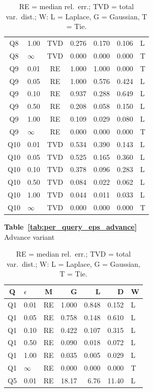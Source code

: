 \documentclass[12pt,letterpaper]{article}
\begin{document}
\begin{table}[H]
\begin{minipage}[t]{0.48\textwidth}
\begin{tabular}{@{}clcrrrl@{}}
Q8 & 1.00 & TVD & 0.276 & 0.170 & 0.106 & L \\
Q8 & $\infty$ & TVD & 0.000 & 0.000 & 0.000 & T \\
\midrule
Q9 & 0.01 & RE & 1.000 & 1.000 & 0.000 & T \\
Q9 & 0.05 & RE & 1.000 & 0.576 & 0.424 & L \\
Q9 & 0.10 & RE & 0.937 & 0.288 & 0.649 & L \\
Q9 & 0.50 & RE & 0.208 & 0.058 & 0.150 & L \\
Q9 & 1.00 & RE & 0.109 & 0.029 & 0.080 & L \\
Q9 & $\infty$ & RE & 0.000 & 0.000 & 0.000 & T \\
\midrule
Q10 & 0.01 & TVD & 0.534 & 0.390 & 0.143 & L \\
Q10 & 0.05 & TVD & 0.525 & 0.165 & 0.360 & L \\
Q10 & 0.10 & TVD & 0.378 & 0.096 & 0.283 & L \\
Q10 & 0.50 & TVD & 0.084 & 0.022 & 0.062 & L \\
Q10 & 1.00 & TVD & 0.044 & 0.011 & 0.033 & L \\
Q10 & $\infty$ & TVD & 0.000 & 0.000 & 0.000 & T \\
\bottomrule
\end{tabular}
\caption{RE = median rel.\ err.; TVD = total var.\ dist.; W: L = Laplace, G = Gaussian, T = Tie.}
\label{tab:per_query_eps_baseline}
\end{minipage}\hfill
\begin{minipage}[t]{0.48\textwidth}
\centering
\scriptsize\noindent\textbf{Table~\ref{tab:per_query_eps_advance}}\\
\scriptsize Advance variant\\[0.35em]
\scriptsize
\begin{tabular}{@{}clcrrrl@{}}
\toprule
\textbf{Q} & \textbf{$\epsilon$} & \textbf{M} & \textbf{G} & \textbf{L} & \textbf{D} & \textbf{W} \\
\midrule
Q1 & 0.01 & RE & 1.000 & 0.848 & 0.152 & L \\
Q1 & 0.05 & RE & 0.758 & 0.148 & 0.610 & L \\
Q1 & 0.10 & RE & 0.422 & 0.107 & 0.315 & L \\
Q1 & 0.50 & RE & 0.090 & 0.018 & 0.072 & L \\
Q1 & 1.00 & RE & 0.035 & 0.005 & 0.029 & L \\
Q1 & $\infty$ & RE & 0.000 & 0.000 & 0.000 & T \\
\midrule
Q5 & 0.01 & RE & 18.17 & 6.76 & 11.40 & L \\

\end{tabular}
\end{minipage}
\end{table}
\end{document}
